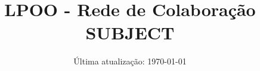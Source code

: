 \documentclass[a4paper,12pt]{article}
\title{ LPOO - Rede de Colaboração \\
SUBJECT }
\author{ }
\date{ Última atualização: \today }
\begin{document}
\maketitle

\ExerciseSelectSUBSET

\ExerciseStopSelect
\end{document}
